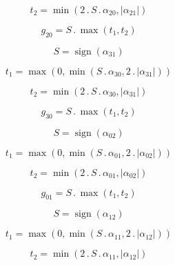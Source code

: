 \documentclass{article}
\begin{document}
\begin{dmath}t_{2} = \min\left(2 \,.\, S \,.\, \alpha_{20}, \left|{\alpha_{21}}\right|\right)\end{dmath}

\begin{dmath}g_{20} = S \,.\, \max\left(t_{1}, t_{2}\right)\end{dmath}

\begin{dmath}S = \operatorname{sign}{\left (\alpha_{31} \right )}\end{dmath}

\begin{dmath}t_{1} = \max\left(0, \min\left(S \,.\, \alpha_{30}, 2 \,.\, \left|{\alpha_{31}}\right|\right)\right)\end{dmath}

\begin{dmath}t_{2} = \min\left(2 \,.\, S \,.\, \alpha_{30}, \left|{\alpha_{31}}\right|\right)\end{dmath}

\begin{dmath}g_{30} = S \,.\, \max\left(t_{1}, t_{2}\right)\end{dmath}

\begin{dmath}S = \operatorname{sign}{\left (\alpha_{02} \right )}\end{dmath}

\begin{dmath}t_{1} = \max\left(0, \min\left(S \,.\, \alpha_{01}, 2 \,.\, \left|{\alpha_{02}}\right|\right)\right)\end{dmath}

\begin{dmath}t_{2} = \min\left(2 \,.\, S \,.\, \alpha_{01}, \left|{\alpha_{02}}\right|\right)\end{dmath}

\begin{dmath}g_{01} = S \,.\, \max\left(t_{1}, t_{2}\right)\end{dmath}

\begin{dmath}S = \operatorname{sign}{\left (\alpha_{12} \right )}\end{dmath}

\begin{dmath}t_{1} = \max\left(0, \min\left(S \,.\, \alpha_{11}, 2 \,.\, \left|{\alpha_{12}}\right|\right)\right)\end{dmath}

\begin{dmath}t_{2} = \min\left(2 \,.\, S \,.\, \alpha_{11}, \left|{\alpha_{12}}\right|\right)\end{dmath}
\end{document}
